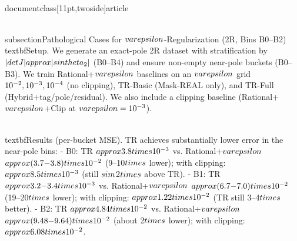 \\documentclass[11pt,twoside]{article}
\begin{document}
\\subsection{Pathological Cases for $\\varepsilon$-Regularization (2R, Bins B0--B2)}
\\textbf{Setup.} We generate an exact-pole 2R dataset with stratification by $|\\det J|\\approx|\\sin\\theta_2|$ (B0--B4) and ensure non-empty near-pole buckets (B0--B3). We train Rational+$\\varepsilon$ baselines on an $\\varepsilon$ grid $\\{10^{-2},10^{-3},10^{-4}\\}$ (no clipping), TR-Basic (Mask-REAL only), and TR-Full (Hybrid+tag/pole/residual). We also include a clipping baseline (Rational+$\\varepsilon$+Clip at $\\varepsilon=10^{-3}$).

\\textbf{Results (per-bucket MSE).} TR achieves substantially lower error in the near-pole bins:
- B0: TR $\\approx 3.8\\times10^{-3}$ vs. Rational+$\\varepsilon$ $\\approx (3.7{-}3.8)\\times10^{-2}$ (9--10$\\times$ lower); with clipping: $\\approx 8.5\\times10^{-3}$ (still $\\sim$2$\\times$ above TR).
- B1: TR $\\approx 3.2{-}3.4\\times10^{-3}$ vs. Rational+$\\varepsilon$ $\\approx (6.7{-}7.0)\\times10^{-2}$ (19--20$\\times$ lower); with clipping: $\\approx 1.22\\times10^{-2}$ (TR still 3--4$\\times$ better).
- B2: TR $\\approx 4.84\\times10^{-2}$ vs. Rational+$\\varepsilon$ $\\approx (9.48{-}9.64)\\times10^{-2}$ (about 2$\\times$ lower); with clipping: $\\approx 6.08\\times10^{-2}$.
\end{document}
